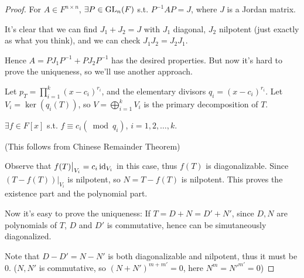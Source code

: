 \begin{proof}[Proof]
    For $A\in F^{n\times n}$, $\exists P\in \mathrm{GL}_n(F)$ s.t. $P^{-1}AP = J$,
	where $J$ is a Jordan matrix.

	It's clear that we can find $J_1 + J_2 = J$ with $J_1$ diagonal, $J_2$ nilpotent
	(just exactly as what you think), and we can check $J_1J_2=J_2J_1$.

	Hence $A = PJ_1P^{-1} + PJ_2P^{-1}$ has the desired properties.
	But now it's hard to prove the uniqueness, so we'll use another approach.

	Let $p_T = \prod_{i=1}^k (x-c_i)^{r_i}$, and the
	elementary divisors $q_{i} = (x-c_i)^{r_i}$.
	Let $V_i = \ker(q_i(T))$, so $V = \bigoplus_{i=1}^k V_i$ is the primary decomposition
	of $T$.
	\begin{claim*}
		$\exists f\in F[x]$ s.t. $f\equiv c_i (\bmod q_i)$, $i = 1,2,\dots,k$.
	\end{claim*}
	(This follows from Chinese Remainder Theorem)

	Observe that $f(T)\big|_{V_i} = c_i\operatorname{id}_{V_i}$ in this case, thus
	$f(T)$ is diagonalizable.
	Since $(T - f(T))\big|_{V_i}$ is nilpotent, so $N = T - f(T)$ is nilpotent.
	This proves the existence part and the polynomial part.

	Now it's easy to prove the uniqueness:
	If $T = D + N = D' + N'$, since $D,N$ are polynomials of $T$,
	$D$ and $D'$ is commutative, hence can be simutaneously diagonalized.

	Note that $D - D' = N - N'$ is both diagonalizable and nilpotent, thus it must be 0.
	($N,N'$ is commutative, so $(N+N')^{m+m'} = 0$, here $N^m=N'^{m'}=0$)
\end{proof}
